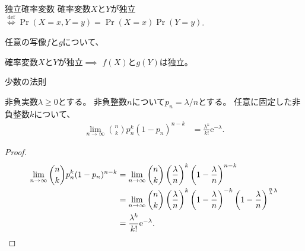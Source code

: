 \documentclass[lualatex,handout]{beamer}
\theoremstyle{definition}
\begin{document}
\begin{frame}{独立確率変数}
確率変数$X$と$Y$が独立$\stackrel{\mathrm{def}}{\iff}\Pr(X=x,Y=y)=\Pr(X=x)\Pr(Y=y)$.

\vspace{2em}
任意の写像$f$と$g$について、

確率変数$X$と$Y$が独立$\implies$ $f(X)$と$g(Y)$は独立。
\end{frame}

\begin{frame}{少数の法則}
\begin{theorem}[少数の法則]
非負実数$\lambda\ge 0$とする。
非負整数$n$について$p_n=\lambda/n$とする。
任意に固定した非負整数$k$について、
\begin{align*}
\lim_{n\to\infty} \binom{n}{k} p_n^k(1-p_n)^{n-k} &= \frac{\lambda^k}{k!}\mathrm{e}^{-\lambda}.
\end{align*}
\end{theorem}
\begin{proof}
\begin{align*}
\lim_{n\to\infty} \binom{n}{k} p_n^k(1-p_n)^{n-k} &= \lim_{n\to\infty} \binom{n}{k} \left(\frac{\lambda}{n}\right)^k\left(1-\frac{\lambda}{n}\right)^{n-k}\\
&= \lim_{n\to\infty} \binom{n}{k} \left(\frac{\lambda}{n}\right)^k\left(1-\frac{\lambda}{n}\right)^{-k}\left(1-\frac{\lambda}{n}\right)^{\frac{n}{\lambda}\lambda}\\
&= \frac{\lambda^k}{k!} \mathrm{e}^{-\lambda}.\qedhere
\end{align*}
\end{proof}
\end{frame}
\end{document}
